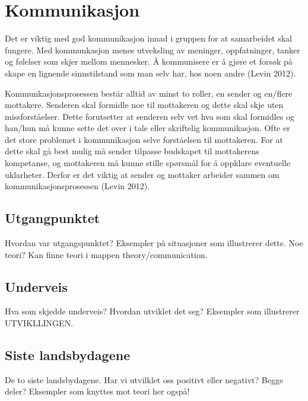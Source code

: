 \section{Kommunikasjon}
Det er viktig med god kommunikasjon innad i gruppen for at samarbeidet skal fungere. 
Med kommunkasjon menes utveksling av meninger, oppfatninger, tanker og følelser som skjer mellom mennesker.
Å kommunisere er å gjøre et forsøk på skape en lignende sinnstilstand som man selv har, hos noen andre (Levin 2012).
\vspace{\secspace}

Kommunkasjonsprosessen består alltid av minst to roller, en sender og en/flere mottakere. 
Senderen skal formidle noe til mottakeren og dette skal skje uten missforståelser. 
Dette forutsetter at senderen selv vet hva som skal formidles og han/hun må kunne sette det over i tale eller skriftelig kommunikasjon. 
Ofte er det store problemet i kommunikasjon selve forståelsen til mottakeren. 
For at dette skal gå best mulig må sender tilpasse budskapet til mottakerens kompetanse, og mottakeren må kunne stille spørsmål for å oppklare eventuelle uklarheter. 
Derfor er det viktig at sender og mottaker arbeider sammen om kommunikasjonsprosessen (Levin 2012).

\subsection{Utgangpunktet}
Hvordan var utgangspunktet?
Eksempler på situasjoner som illustrerer dette. 
Noe teori? Kan finne teori i mappen theory/communication. 

\subsection{Underveis}
Hva som skjedde underveis? 
Hvordan utviklet det seg? 
Eksempler som illustrerer UTVIKLLINGEN. 

\subsection{Siste landsbydagene}
De to siste landsbydagene.
Har vi utvilklet oss positivt eller negativt? Begge deler? 
Eksempler som knyttes mot teori her ogspå! 

